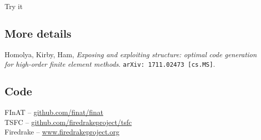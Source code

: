 \documentclass[cmyk,luatex,a0paper,portrait]{baposter}
\begin{document}
\begin{poster}
\begin{posterbox}[name=try, column=3, below=curl-curl,
    span=3, height=0.235]{Try it}
    \subsection*{More details}
    \vspace{-0.35\baselineskip}
    Homolya, Kirby, Ham, \emph{Exposing and exploiting structure:
      optimal code generation for high-order finite element
      methods}. \texttt{arXiv:\,1711.02473\,[cs.MS]}.
    \vspace{-\baselineskip}
    \subsection*{Code}
    \vspace{-0.35\baselineskip}
    FInAT -- \url{github.com/finat/finat}\\[0.25\baselineskip]
    TSFC -- \url{github.com/firedrakeproject/tsfc}\\[0.25\baselineskip]
    Firedrake -- \url{www.firedrakeproject.org}


\end{posterbox}
\end{poster}
\end{document}
